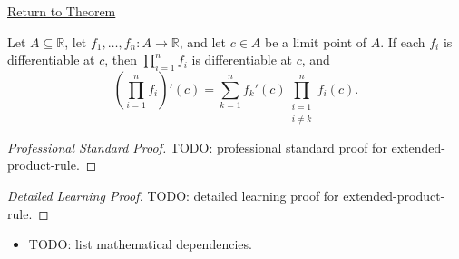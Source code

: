 \newpage
{}
\label{prf:extended-product-rule}

\begin{remark*}[Return]
\hyperref[cor:extended-product-rule]{Return to Theorem}
\end{remark*}

\begin{theorem*}
Let $A \subseteq \mathbb{R}$, let $f_1, \dots, f_n : A \to \mathbb{R}$, and let $c \in A$ be a limit point of $A$. If each $f_i$ is differentiable at $c$, then $\prod_{i=1}^{n} f_i$ is differentiable at $c$, and
\[
\left(\prod_{i=1}^{n} f_i\right)'(c)
=
\sum_{k=1}^{n}
f_k'(c) \prod_{\substack{i=1\\i\neq k}}^{n} f_i(c).
\]
\end{theorem*}

\begin{proof}[Professional Standard Proof]
\LRAProofBodyStart
TODO: professional standard proof for extended-product-rule.
\end{proof}

\begin{proof}[Detailed Learning Proof]
\LRAProofBodyStart
TODO: detailed learning proof for extended-product-rule.
\end{proof}

\begin{remark*}
\end{remark*}

\begin{dependencies}
\begin{itemize}
  \item TODO: list mathematical dependencies.
\end{itemize}
\end{dependencies}

\clearpage
